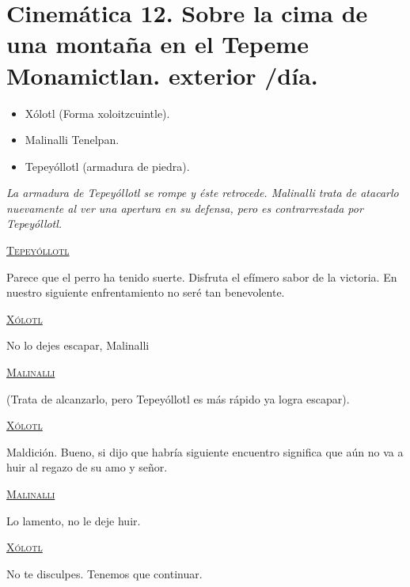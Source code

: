 \section{Cinemática 12. Sobre la cima de una montaña en el Tepeme Monamictlan. exterior /día.}
\label{Cin:Cinematica12}
\textsc{\underline{ }}
\begin{itemize}
\item Xólotl (Forma xoloitzcuintle).
\item Malinalli Tenelpan.
\item Tepeyóllotl (armadura de piedra).
\end{itemize}
\textit{La armadura de Tepeyóllotl se rompe y éste retrocede. Malinalli trata de atacarlo nuevamente al ver una apertura en su defensa, pero es contrarrestada por Tepeyóllotl.}

\begin{center}
\textsc{\underline{Tepeyóllotl}}
\\
\par
Parece que el perro ha tenido suerte. Disfruta el efímero sabor de la victoria. En nuestro siguiente enfrentamiento no seré tan benevolente.
\\
\par
\textsc{\underline{Xólotl}}
\\
\par
No lo dejes escapar, Malinalli
\\
\par
\textsc{\underline{Malinalli}}
\\
\par
(Trata de alcanzarlo, pero Tepeyóllotl es más rápido ya logra escapar).
\\
\par
\textsc{\underline{Xólotl}}
\\
\par
Maldición. Bueno, si dijo que habría siguiente encuentro significa que aún no va a huir al regazo de su amo y señor.
\\
\par
\textsc{\underline{Malinalli}}
\\
\par
Lo lamento, no le deje huir.
\\
\par
\textsc{\underline{Xólotl}}
\\
\par
No te disculpes. Tenemos que continuar.
\end{center}